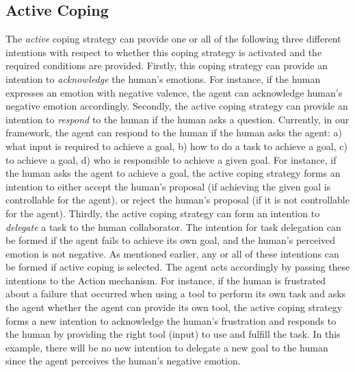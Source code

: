 \documentclass[12pt]{report}
\begin{document}
\subsection{Active Coping}
The \textit{active} coping strategy can provide one or all of the following
three different intentions with respect to whether this coping strategy is
activated and the required conditions are provided. Firstly, this coping
strategy can provide an intention to \textit{acknowledge} the human's emotions.
For instance, if the human expresses an emotion with negative valence, the agent
can acknowledge human's negative emotion accordingly. Secondly, the active
coping strategy can provide an intention to \textit{respond} to the human if
the human asks a question. Currently, in our framework, the agent can respond to
the human if the human asks the agent: a) what input is required to achieve a
goal, b) how to do a task to achieve a goal, c) to achieve a goal, d) who is
responsible to achieve a given goal. For instance, if the human asks the agent
to achieve a goal, the active coping strategy forms an intention to either
accept the human's proposal (if achieving the given goal is controllable for the
agent), or reject the human's proposal (if it is not controllable for the
agent). Thirdly, the active coping strategy can form an intention to
\textit{delegate} a task to the human collaborator. The intention for task
delegation can be formed if the agent fails to achieve its own goal, and the
human's perceived emotion is not negative. As mentioned earlier, any or all of
these intentions can be formed if active coping is selected. The agent acts
accordingly by passing these intentions to the Action mechanism. For instance,
if the human is frustrated about a failure that occurred when using a tool to
perform its own task and asks the agent whether the agent can provide its own
tool, the active coping strategy forms a new intention to acknowledge the
human's frustration and responds to the human by providing the right tool
(input) to use and fulfill the task. In this example, there will be no new
intention to delegate a new goal to the human since the agent perceives the
human's negative emotion.
\end{document}
